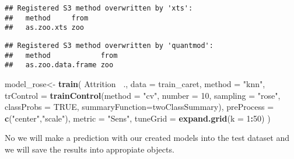 \documentclass[
]{article}
\newenvironment{Shaded}{\begin{snugshade}}{\end{snugshade}}
\newcommand{\DataTypeTok}[1]{\textcolor[rgb]{0.13,0.29,0.53}{#1}}
\newcommand{\DecValTok}[1]{\textcolor[rgb]{0.00,0.00,0.81}{#1}}
\newcommand{\KeywordTok}[1]{\textcolor[rgb]{0.13,0.29,0.53}{\textbf{#1}}}
\newcommand{\NormalTok}[1]{#1}
\newcommand{\OperatorTok}[1]{\textcolor[rgb]{0.81,0.36,0.00}{\textbf{#1}}}
\newcommand{\OtherTok}[1]{\textcolor[rgb]{0.56,0.35,0.01}{#1}}
\newcommand{\StringTok}[1]{\textcolor[rgb]{0.31,0.60,0.02}{#1}}
\begin{document}
\begin{verbatim}
## Registered S3 method overwritten by 'xts':
##   method     from
##   as.zoo.xts zoo
\end{verbatim}

\begin{verbatim}
## Registered S3 method overwritten by 'quantmod':
##   method            from
##   as.zoo.data.frame zoo
\end{verbatim}

\begin{Shaded}
\begin{Highlighting}[]
\NormalTok{model_rose<-}\StringTok{ }\KeywordTok{train}\NormalTok{(}
\NormalTok{  Attrition }\OperatorTok{~}\NormalTok{., }\DataTypeTok{data =}\NormalTok{ train_caret, }\DataTypeTok{method =} \StringTok{"knn"}\NormalTok{,}
  \DataTypeTok{trControl =} \KeywordTok{trainControl}\NormalTok{(}\DataTypeTok{method =} \StringTok{"cv"}\NormalTok{,}
                           \DataTypeTok{number =} \DecValTok{10}\NormalTok{,}
                           \DataTypeTok{sampling =} \StringTok{"rose"}\NormalTok{,}
                           \DataTypeTok{classProbs =} \OtherTok{TRUE}\NormalTok{,}
                           \DataTypeTok{summaryFunction=}\NormalTok{twoClassSummary),}
  \DataTypeTok{preProcess =} \KeywordTok{c}\NormalTok{(}\StringTok{"center"}\NormalTok{,}\StringTok{"scale"}\NormalTok{),}
  \DataTypeTok{metric =} \StringTok{"Sens"}\NormalTok{,}
  \DataTypeTok{tuneGrid =} \KeywordTok{expand.grid}\NormalTok{(}\DataTypeTok{k =} \DecValTok{1}\OperatorTok{:}\DecValTok{50}\NormalTok{)}
\NormalTok{  )}
\end{Highlighting}
\end{Shaded}

No we will make a prediction with our created models into the test
dataset and we will save the results into appropiate objects.

\begin{Shaded}
\end{Shaded}
\end{document}
